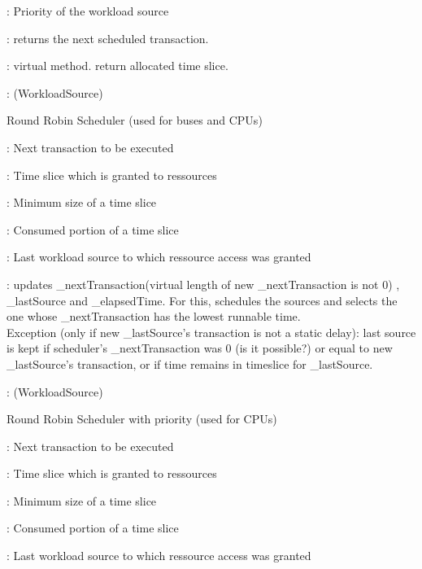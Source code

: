 \documentclass[a4paper,11pt]{article}
\newcommand{\bfont}{\fontseries{b}\selectfont}
\newcommand{\cod}[1]{{\ttfamily #1}}
\newcommand{\class}[2]{\par\vspace{1mm}\hspace{-5mm}\large\colorbox{file}{\textbullet\bfont\cod{#1}:} (\cod{#2})\par}
\newcommand{\method}[1]{\par\vspace{1mm}\hspace{-2mm}\colorbox{method}{\textopenbullet\bfont\cod{#1}:}}
\newcommand{\variable}[1]{\par\vspace{1mm}\hspace{-2mm}\colorbox{variable}{\textopenbullet\bfont\cod{#1}:}}
\begin{document}
\variable{\_priority} Priority of the workload source

\method{getNextTransaction} returns the next scheduled transaction.

\method{schedule(iEndSchedule)} virtual method. return allocated time slice.

\class{RRScheduler}{WorkloadSource}
Round Robin Scheduler (used for buses and CPUs)
\variable{\_nextTransaction} Next transaction to be executed

\variable{\_timeSlice} Time slice which is granted to ressources

\variable{\_minSliceSize} Minimum size of a time slice

\variable{\_elapsedTime} Consumed portion of a time slice

\variable{\_lastSource} Last workload source to which ressource access was granted

\method{schedule(iEndSchedule)} updates \cod{\_nextTransaction}(virtual length of new \cod{\_next\-Transaction} is not 0) , \cod{\_lastSource} and \cod{\_elapsedTime}.
For this, schedules the sources and selects the one whose \cod{\_nextTransaction} has the lowest runnable time.\\ Exception (only if new  \cod{\_lastSource}'s transaction is not a static delay): last source is kept if scheduler's \cod{\_nextTransaction} was 0 (is it possible?) or equal to  new  \cod{\_lastSource}'s transaction, or if time remains in timeslice for \cod{\_lastSource}.

\class{RRPrioScheduler}{WorkloadSource}
Round Robin Scheduler with priority (used for CPUs)
\variable{\_nextTransaction} Next transaction to be executed

\variable{\_timeSlice} Time slice which is granted to ressources

\variable{\_minSliceSize} Minimum size of a time slice

\variable{\_elapsedTime} Consumed portion of a time slice

\variable{\_lastSource} Last workload source to which ressource access was granted
\end{document}
